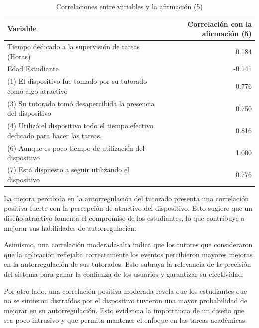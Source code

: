\documentclass[a4paper,fleqn]{cas-sc}
\begin{document}
			\begin{table}[h!]
				\centering
				\caption{Correlaciones entre variables y la afirmación (5)}
				\begin{tabularx}{\textwidth}{Xr}
					\toprule
					\textbf{Variable} & \textbf{Correlación con la afirmación (5)} \\
					\midrule
					Tiempo dedicado a la supervisión de tareas (Horas)                                   & 0.184 \\
					Edad Estudiante                                                                      &-0.141 \\
					(1) El dispositivo fue tomado por su tutorado como algo atractivo                    & 0.776 \\
					(3) Su tutorado tomó desapercibida la presencia del dispositivo                      & 0.750 \\
					(4) Utilizó el dispositivo todo el tiempo efectivo dedicado para hacer las tareas.   & 0.816 \\
					(6) Aunque es poco tiempo de utilización del dispositivo                             & 1.000 \\
					(7) Está dispuesto a seguir utilizando el dispositivo                                & 0.776 \\
					\bottomrule
				\end{tabularx}
				\label{table:correlations}
			\end{table}			
				
			La mejora percibida en la autorregulación del tutorado presenta una correlación positiva fuerte con la percepción de atractivo del dispositivo. Esto sugiere que un diseño atractivo fomenta el compromiso de los estudiantes, lo que contribuye a mejorar sus habilidades de autorregulación.
				
			Asimismo, una correlación moderada-alta indica que los tutores que consideraron que la aplicación reflejaba correctamente los eventos percibieron mayores mejoras en la autorregulación de sus tutorados. Esto subraya la relevancia de la precisión del sistema para ganar la confianza de los usuarios y garantizar su efectividad.
				
			Por otro lado, una correlación positiva moderada revela que los estudiantes que no se sintieron distraídos por el dispositivo tuvieron una mayor probabilidad de mejorar en su autorregulación. Esto evidencia la importancia de un diseño que sea poco intrusivo y que permita mantener el enfoque en las tareas académicas.
				
\end{document}
